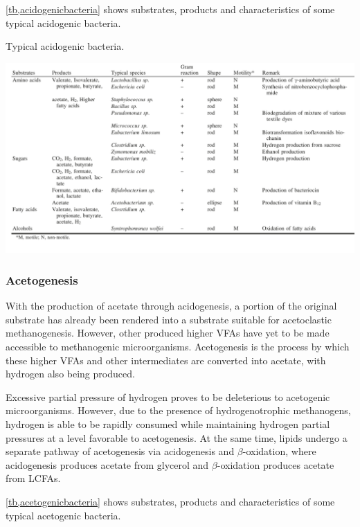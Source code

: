 \documentclass[fontsize=12pt,headsepline=true, bibliography=totocnumbered, twoside]{scrbook} %
\begin{document}
\autoref{tb,acidogenicbacteria} shows substrates, products and characteristics of some typical acidogenic bacteria.



\begin{table}
\center
\caption[Typical acidogenic bacteria]{Typical acidogenic bacteria.\citep{amani2010anaerobic}}
\vspace{0.3cm}
\includegraphics[scale=0.71]{acidogenicbacteria}
\label{tb,acidogenicbacteria}
\end{table}



\subsubsection{Acetogenesis}

With the production of acetate through acidogenesis, a portion of the original substrate has already been rendered into a substrate suitable for acetoclastic methanogenesis. However, other produced higher \ac{VFAs} have yet to be made accessible to methanogenic microorganisms. Acetogenesis is the process by which these higher \ac{VFAs}  and other intermediates are converted into acetate, with hydrogen also being produced. 


Excessive partial pressure of hydrogen proves to be deleterious to acetogenic microorganisms. However, due to the presence of hydrogenotrophic methanogens, hydrogen is able to be rapidly consumed while maintaining hydrogen partial pressures at a level favorable to acetogenesis. At the same time, lipids undergo a separate pathway of acetogenesis via acidogenesis and $\beta$-oxidation, where acidogenesis produces acetate from glycerol and $\beta$-oxidation produces acetate from \ac{LCFAs}\citep{patel}.

\autoref{tb,acetogenicbacteria} shows substrates, products and characteristics of some typical acetogenic bacteria.
\end{document}
